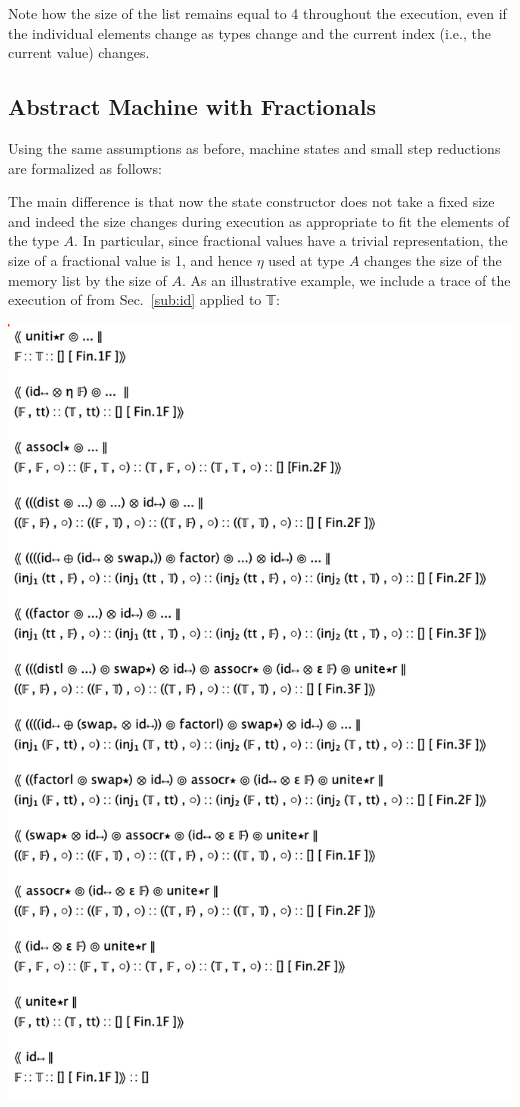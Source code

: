 \documentclass[sigplan,10pt,review,anonymous]{acmart}
\begin{document}
Note how the size of the list remains equal to 4 throughout the
execution, even if the individual elements change as types change and
the current index (i.e., the current value) changes.


\subsection{Abstract Machine with Fractionals}

Using the same assumptions as before, machine states and small step
reductions are formalized as follows:

\PIFMEMstep{}

The main difference is that now the state constructor does not take a
fixed size and indeed the size changes during execution as appropriate
to fit the elements of the type $A$. In particular, since fractional
values have a trivial representation, the size of a fractional value
is 1, and hence $\eta$ used at type $A$ changes the size of the memory
list by the size of $A$. As an illustrative example, we include a
trace of the execution of  from Sec.~\ref{sub:id}
applied to 𝕋:

\includegraphics[scale=0.5]{trace2.png}
\end{document}

